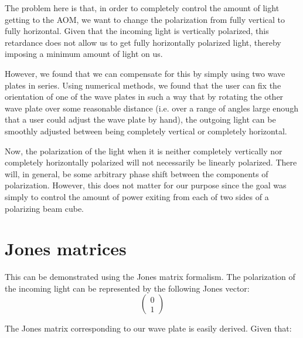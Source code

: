 The problem here is that, in order to completely control the amount of light getting to the AOM, we want to change the polarization from fully vertical to fully horizontal. Given that the incoming light is vertically polarized, this retardance does not allow us to get fully horizontally polarized light, thereby imposing a minimum amount of light on us.

However, we found that we can compensate for this by simply using two wave plates in series. Using numerical methods, we found that the user can fix the orientation of one of the wave plates in such a way that by rotating the other wave plate over some reasonable distance (i.e. over a range of angles large enough that a user could adjust the wave plate by hand), the outgoing light can be smoothly adjusted between being completely vertical or completely horizontal. 

Now, the polarization of the light when it is neither completely vertically nor completely horizontally polarized will not necessarily be linearly polarized. There will, in general, be some arbitrary phase shift between the components of polarization. However, this does not matter for our purpose since the goal was simply to control the amount of power exiting from each of two sides of a polarizing beam cube. 

\section{Jones matrices}
This can be demonstrated using the Jones matrix formalism. The polarization of the incoming light can be represented by the following Jones vector: 
\begin{equation}
\begin{pmatrix}
0\\1
\end{pmatrix}
\end{equation}

The Jones matrix corresponding to our wave plate is easily derived. Given that: 


